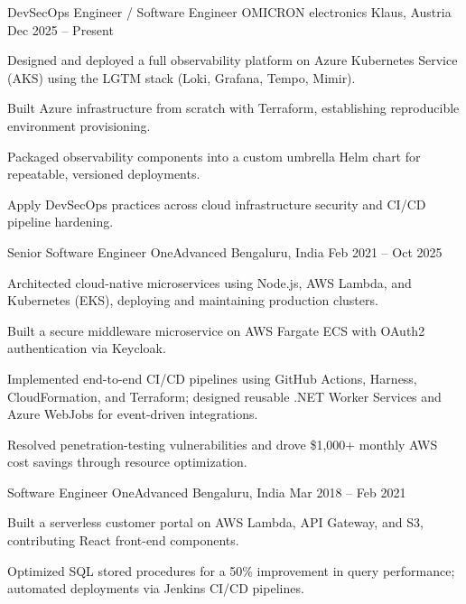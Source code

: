\documentclass[11pt, a4paper]{awesome-cv}
\begin{document}
\begin{cventries}

  \cventry
    {DevSecOps Engineer / Software Engineer}
    {OMICRON electronics}
    {Klaus, Austria}
    {Dec 2025 -- Present}
    {
      \begin{cvitems}
        \item {Designed and deployed a full observability platform on Azure Kubernetes Service (AKS) using the LGTM stack (Loki, Grafana, Tempo, Mimir).}
        \item {Built Azure infrastructure from scratch with Terraform, establishing reproducible environment provisioning.}
        \item {Packaged observability components into a custom umbrella Helm chart for repeatable, versioned deployments.}
        \item {Apply DevSecOps practices across cloud infrastructure security and CI/CD pipeline hardening.}
      \end{cvitems}
    }

  \cventry
    {Senior Software Engineer}
    {OneAdvanced}
    {Bengaluru, India}
    {Feb 2021 -- Oct 2025}
    {
      \begin{cvitems}
        \item {Architected cloud-native microservices using Node.js, AWS Lambda, and Kubernetes (EKS), deploying and maintaining production clusters.}
        \item {Built a secure middleware microservice on AWS Fargate ECS with OAuth2 authentication via Keycloak.}
        \item {Implemented end-to-end CI/CD pipelines using GitHub Actions, Harness, CloudFormation, and Terraform; designed reusable .NET Worker Services and Azure WebJobs for event-driven integrations.}
        \item {Resolved penetration-testing vulnerabilities and drove \$1,000+ monthly AWS cost savings through resource optimization.}
      \end{cvitems}
    }

  \cventry
    {Software Engineer}
    {OneAdvanced}
    {Bengaluru, India}
    {Mar 2018 -- Feb 2021}
    {
      \begin{cvitems}
        \item {Built a serverless customer portal on AWS Lambda, API Gateway, and S3, contributing React front-end components.}
        \item {Optimized SQL stored procedures for a 50\% improvement in query performance; automated deployments via Jenkins CI/CD pipelines.}
      \end{cvitems}
    }


\end{cventries}
\end{document}
